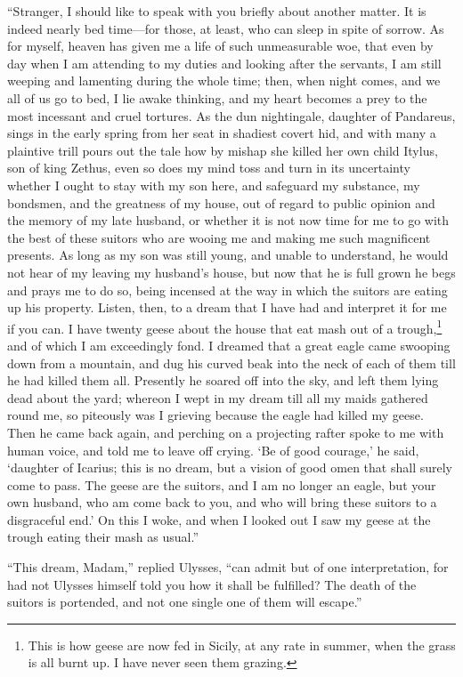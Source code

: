 “Stranger, I should like to speak with you briefly about another matter. It is
indeed nearly bed time—for those, at least, who can sleep in spite of sorrow.
As for myself, heaven has given me a life of such unmeasurable woe, that even
by day when I am attending to my duties and looking after the servants, I am
still weeping and lamenting during the whole time; then, when night comes, and
we all of us go to bed, I lie awake thinking, and my heart becomes a prey to
the most incessant and cruel tortures. As the dun nightingale, daughter of
Pandareus, sings in the early spring from her seat in shadiest covert hid, and
with many a plaintive trill pours out the tale how by mishap she killed her own
child Itylus, son of king Zethus, even so does my mind toss and turn in its
uncertainty whether I ought to stay with my son here, and safeguard my
substance, my bondsmen, and the greatness of my house, out of regard to public
opinion and the memory of my late husband, or whether it is not now time for me
to go with the best of these suitors who are wooing me and making me such
magnificent presents. As long as my son was still young, and unable to
understand, he would not hear of my leaving my husband’s house, but now that he
is full grown he begs and prays me to do so, being incensed at the way in which
the suitors are eating up his property. Listen, then, to a dream that I have
had and interpret it for me if you can. I have twenty geese about the house
that eat mash out of a trough,\footnote{This is how geese are now fed in Sicily, at any rate in summer, when the
grass is all burnt up. I have never seen them grazing.} and of which I am exceedingly fond.
I dreamed that a great eagle came swooping down from a mountain, and dug his
curved beak into the neck of each of them till he had killed them all.
Presently he soared off into the sky, and left them lying dead about the yard;
whereon I wept in my dream till all my maids gathered round me, so piteously
was I grieving because the eagle had killed my geese. Then he came back again,
and perching on a projecting rafter spoke to me with human voice, and told me
to leave off crying. ‘Be of good courage,’ he said, ‘daughter of Icarius; this
is no dream, but a vision of good omen that shall surely come to pass. The
geese are the suitors, and I am no longer an eagle, but your own husband, who
am come back to you, and who will bring these suitors to a disgraceful end.’ On
this I woke, and when I looked out I saw my geese at the trough eating their
mash as usual.”

“This dream, Madam,” replied Ulysses, “can admit but of one interpretation, for
had not Ulysses himself told you how it shall be fulfilled? The death of the
suitors is portended, and not one single one of them will escape.”

